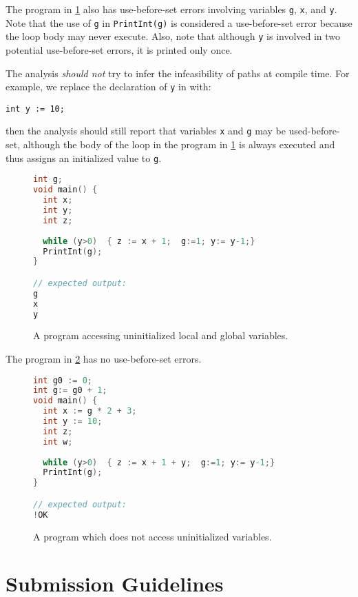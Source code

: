 \documentclass{article}
\begin{document}
The program in \cref{fig:example-loop} also has use-before-set errors involving variables \texttt{g}, \texttt{x}, and \texttt{y}.
Note that the use of \texttt{g} in \texttt{PrintInt(g)} is considered a use-before-set error because the loop body may never execute.
Also, note that although \texttt{y} is involved in two potential use-before-set errors, it is printed only once.

The analysis \emph{should not} try to infer the infeasibility of paths at compile time.
For example, we replace the declaration of \texttt{y} in  with:
\begin{lstlisting}
int y := 10;
\end{lstlisting}
then the analysis should still report that variables \texttt{x} and \texttt{g} may be used-before-set,
although the body of the loop in the program in \cref{fig:example-loop} is always executed and thus assigns an initialized value to \texttt{g}.

\begin{figure}
\centering
\begin{lstlisting}[language=C]
int g;
void main() {
  int x;
  int y;
  int z;
  
  while (y>0)  { z := x + 1;  g:=1; y:= y-1;}
  PrintInt(g);
}

// expected output:
g
x
y
\end{lstlisting}
\caption{A program accessing uninitialized local and global variables.}
\label{fig:example-loop}
\end{figure} 

The program in \cref{fig:example-ok}  has no use-before-set errors. 

\begin{figure}
\centering
\begin{lstlisting}[language=C]
int g0 := 0;
int g:= g0 + 1;
void main() {
  int x := g * 2 + 3;
  int y := 10;
  int z;
  int w;
  
  while (y>0)  { z := x + 1 + y;  g:=1; y:= y-1;}
  PrintInt(g);
}

// expected output:
!OK
\end{lstlisting}
\caption{A program which does not access uninitialized variables.}
\label{fig:example-ok}
\end{figure} 

\section{Submission Guidelines}
 
\end{document}
